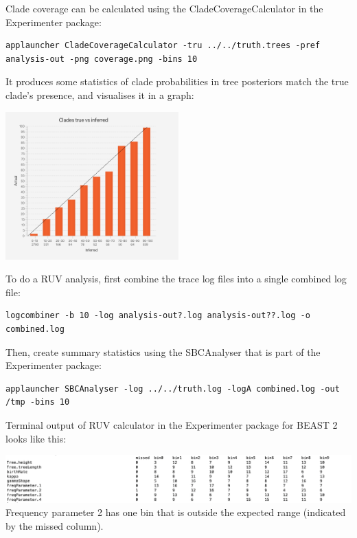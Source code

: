 \documentclass[oneside]{article}
\begin{document}
Clade coverage can be calculated using the CladeCoverageCalculator in the Experimenter package:

{\scriptsize
\begin{lstlisting}
applauncher CladeCoverageCalculator -tru ../../truth.trees -pref analysis-out -png coverage.png -bins 10
\end{lstlisting}
}

It produces some statistics of clade probabilities in tree posteriors match the true clade's presence, and visualises it in a graph:

\begin{center}
   \includegraphics[width=0.5\textwidth]{../figures/experimentercoverage.png}
\end{center}

To do a RUV analysis, first combine the trace log files into a single combined log file:

{\scriptsize
\begin{lstlisting}
logcombiner -b 10 -log analysis-out?.log analysis-out??.log -o combined.log
\end{lstlisting}
}


Then, create summary statistics using the SBCAnalyser that is part of the Experimenter package:

{\scriptsize
\begin{lstlisting}
applauncher SBCAnalyser -log ../../truth.log -logA combined.log -out /tmp -bins 10
\end{lstlisting}
}


Terminal output of RUV calculator in the Experimenter package for BEAST 2 looks like this:

   \includegraphics[width=\textwidth]{../figures/sbscalculator0.png}
   {
   Frequency parameter 2 has one bin that is outside the expected range (indicated by the missed column).
   }
\end{document}
